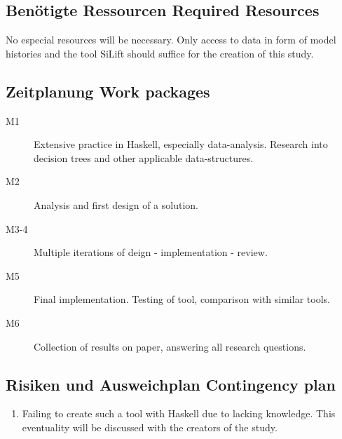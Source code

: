 \documentclass[10pt,a4paper,oneside]{scrartcl}
\begin{document}
	\subsection{
		{Benötigte Ressourcen}
		{Required Resources}}
	\label{sub:resources}
	No especial resources will be necessary. Only access to data in form of model histories and the tool SiLift should suffice for the creation of this study.
	
	\subsection{
		{Zeitplanung}
		{Work packages}}
	\label{sub:wp}
	
	
	\begin{description}
		\item[M1] Extensive practice in Haskell, especially data-analysis. Research into decision trees and other applicable data-structures.
		\item[M2] Analysis and first design of a solution.
		\item[M3-4] Multiple iterations of deign - implementation - review.
		\item[M5] Final implementation. Testing of tool, comparison with similar tools.
		\item[M6] Collection of results on paper, answering all research questions.
	\end{description}
	
	\subsection{
		{Risiken und Ausweichplan}
		{Contingency plan}}
	\label{sub:contingency}
	
	
	\begin{enumerate}
		\item Failing to create such a tool with Haskell due to lacking knowledge. This eventuality will be discussed with the creators of the study.
	\end{enumerate}
	
	\nocite{*}
	\printbibliography
	
\end{document}
